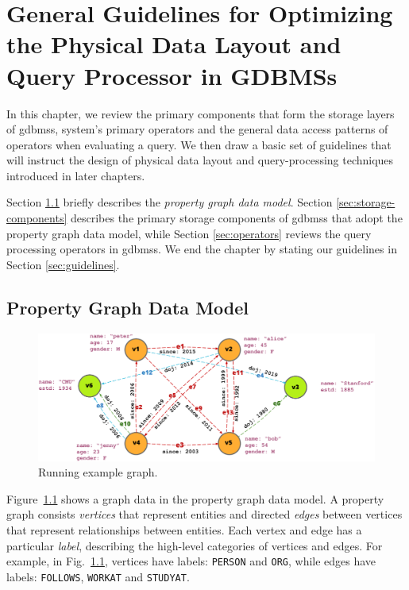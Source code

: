 \chapter{General Guidelines for Optimizing the Physical Data Layout and Query Processor in GDBMSs}
\label{c:guidelines}

In this chapter, we review the primary components that form the storage layers of \gls{gdbms}s, system's primary operators and the general data access patterns of operators when evaluating a query. We then draw a basic set of guidelines that will instruct the design of physical data layout and query-processing techniques introduced in later chapters.

Section \ref{sec:property-graph-data-model} briefly describes the \emph{property graph data model}. Section \ref{sec:storage-components} describes the primary storage components of \gls{gdbms}s that adopt the property graph data model, while Section \ref{sec:operators} reviews the query processing operators in \gls{gdbms}s. We end the chapter by stating our guidelines in Section \ref{sec:guidelines}.

\section{Property Graph Data Model}
\label{sec:property-graph-data-model}

\begin{figure}
	\includegraphics[scale=0.86]{img/property-graph}
	\vspace{-8pt}
	\caption{Running example graph.}
	\label{fig:runn}
	\vspace{-8pt}
\end{figure}

Figure~\ref{fig:runn} shows a graph data in the property graph data model. A property graph consists \emph{vertices} that represent entities and directed \emph{edges} between vertices that represent relationships between entities. Each vertex and edge has a particular \emph{label}, describing the high-level categories of vertices and edges. For example, in Fig.~\ref{fig:runn}, vertices have labels: \texttt{PERSON} and \texttt{ORG}, while edges have labels: \texttt{FOLLOWS}, \texttt{WORKAT} and \texttt{STUDYAT}.

